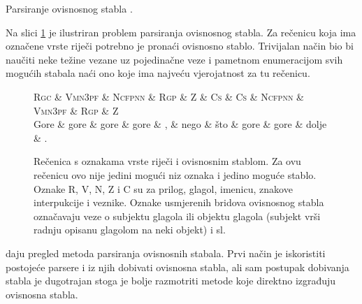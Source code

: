 Parsiranje ovisnosnog stabla  \citep{chang2015learning}.


Na slici \ref{fig:depparsing} je ilustriran problem parsiranja ovisnosnog
stabla. Za rečenicu koja ima označene vrste riječi potrebno je pronaći ovisnosno
stablo. Trivijalan način bio bi naučiti neke težine vezane uz pojedinačne veze i
pametnom enumeracijom svih mogućih stabala naći ono koje ima najveću vjerojatnost za tu rečenicu.

\begin{figure}
\centering
\begin{dependency}[theme = simple]
\begin{deptext}
  \textsc{Rgc} \& \textsc{Vmn3pf} \& \textsc{Ncfpnn} \& \textsc{Rgp} \& \textsc{Z} \& \textsc{Cs} \& \textsc{Cs} \& \textsc{Ncfpnn} \& \textsc{Vmn3pf} \& \textsc{Rgp} \& \textsc{Z} \\
  Gore         \& gore            \& gore            \& gore         \& ,          \& nego        \& što         \& gore            \& gore            \& dolje        \& .          \\
\end{deptext}
\end{dependency}
\caption[Rečenica s oznakama vrste riječi i ovisnosnim stablom.]{Rečenica s
oznakama vrste riječi i ovisnosnim stablom. Za ovu rečenicu ovo nije jedini
mogući niz oznaka i jedino moguće stablo. Oznake R, V, N, Z i C su za prilog,
glagol, imenicu, znakove interpukcije i veznike. Oznake usmjerenih bridova
ovisnosnog stabla označavaju veze o subjektu glagola ili objektu glagola
(subjekt vrši radnju opisanu glagolom na neki objekt) i sl.}
\label{fig:depparsing}
\end{figure}

\citet{cer2010parsing} daju pregled metoda parsiranja ovisnosnih stabala. Prvi
način je iskoristiti postojeće  parsere i iz njih dobivati
ovisnosna stabla, ali sam postupak dobivanja  stabla je
dugotrajan stoga je bolje razmotriti metode koje direktno izgrađuju ovisnosna
stabla.

